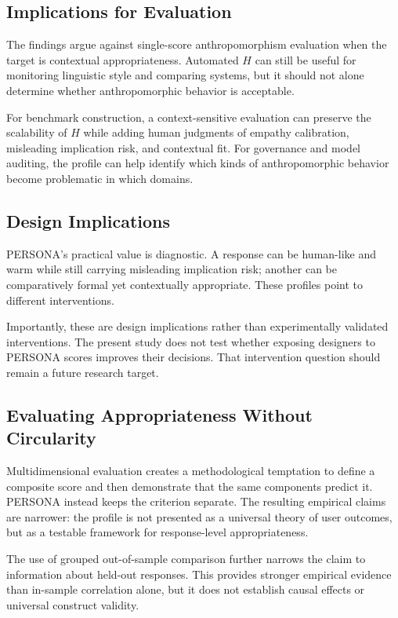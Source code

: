 \documentclass[manuscript,review,anonymous]{acmart}
\begin{document}
\subsection{Implications for Evaluation}

The findings argue against single-score anthropomorphism evaluation when the target is contextual appropriateness. Automated $H$ can still be useful for monitoring linguistic style and comparing systems, but it should not alone determine whether anthropomorphic behavior is acceptable.

For benchmark construction, a context-sensitive evaluation can preserve the scalability of $H$ while adding human judgments of empathy calibration, misleading implication risk, and contextual fit. For governance and model auditing, the profile can help identify which kinds of anthropomorphic behavior become problematic in which domains.

\subsection{Design Implications}

PERSONA's practical value is diagnostic. A response can be human-like and warm while still carrying misleading implication risk; another can be comparatively formal yet contextually appropriate. These profiles point to different interventions.

Importantly, these are design implications rather than experimentally validated interventions. The present study does not test whether exposing designers to PERSONA scores improves their decisions. That intervention question should remain a future research target.

\subsection{Evaluating Appropriateness Without Circularity}

Multidimensional evaluation creates a methodological temptation to define a composite score and then demonstrate that the same components predict it. PERSONA instead keeps the criterion separate. The resulting empirical claims are narrower: the profile is not presented as a universal theory of user outcomes, but as a testable framework for response-level appropriateness.

The use of grouped out-of-sample comparison further narrows the claim to information about held-out responses. This provides stronger empirical evidence than in-sample correlation alone, but it does not establish causal effects or universal construct validity.
\end{document}
